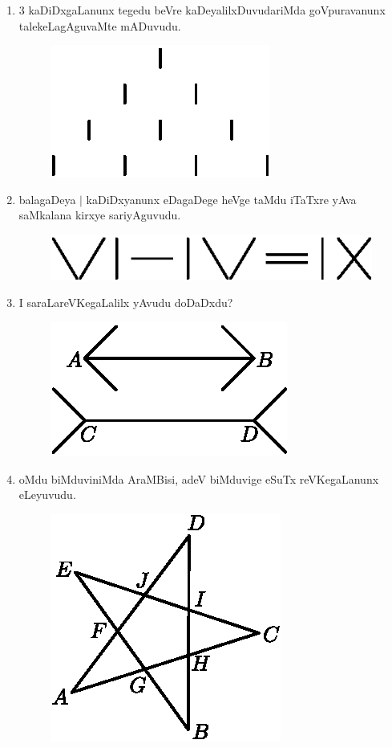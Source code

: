 \begin{enumerate}
\item $3$ kaDiDxgaLanunx tegedu beVre kaDeyalilxDuvudariMda goVpuravanunx talekeLagAguvaMte mADuvudu.
\begin{figure}[H]
\centering
\includegraphics{src/figures/exr42.eps}
\end{figure}

\item balagaDeya $|$ kaDiDxyanunx eDagaDege heVge taMdu iTaTxre yAva saMkalana kirxye sariyAguvudu.
\begin{figure}[H]
\centering
\includegraphics{src/figures/exr43.eps}
\end{figure}

\item I saraLareVKegaLalilx yAvudu doDaDxdu?
\begin{figure}[H]
\centering
\includegraphics{src/figures/exr44.eps}
\end{figure}


\item oMdu biMduviniMda AraMBisi, adeV biMduvige eSuTx reVKegaLanunx eLeyuvudu.
\begin{figure}[H]
\centering
\includegraphics{src/figures/exr45.eps}
\end{figure}


\end{enumerate}
